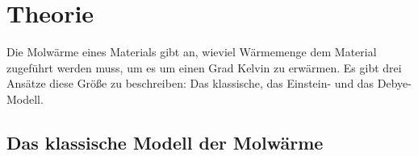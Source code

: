 \section{Theorie}
\label{sec:Theorie}

\cite{sample}


Die Molwärme eines Materials gibt an, wieviel Wärmemenge dem Material zugeführt werden muss, um es um einen Grad Kelvin zu erwärmen.
Es gibt drei Ansätze diese Größe zu beschreiben: Das klassische, das Einstein- und das Debye-Modell.

\subsection{Das klassische Modell der Molwärme}


